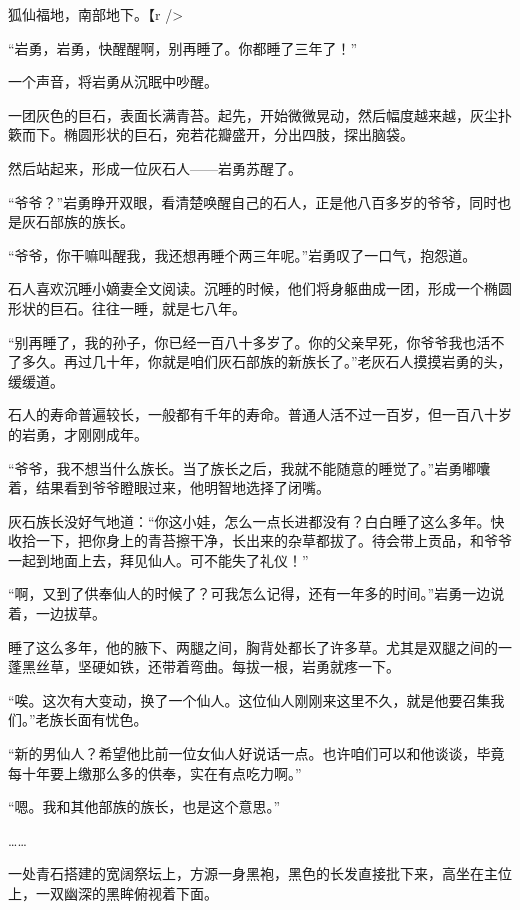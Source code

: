 
\begin{this_body}

狐仙福地，南部地下。【r />

“岩勇，岩勇，快醒醒啊，别再睡了。你都睡了三年了！”

一个声音，将岩勇从沉眠中吵醒。

一团灰色的巨石，表面长满青苔。起先，开始微微晃动，然后幅度越来越，灰尘扑簌而下。椭圆形状的巨石，宛若花瓣盛开，分出四肢，探出脑袋。

然后站起来，形成一位灰石人——岩勇苏醒了。

“爷爷？”岩勇睁开双眼，看清楚唤醒自己的石人，正是他八百多岁的爷爷，同时也是灰石部族的族长。

“爷爷，你干嘛叫醒我，我还想再睡个两三年呢。”岩勇叹了一口气，抱怨道。

石人喜欢沉睡小嫡妻全文阅读。沉睡的时候，他们将身躯曲成一团，形成一个椭圆形状的巨石。往往一睡，就是七八年。

“别再睡了，我的孙子，你已经一百八十多岁了。你的父亲早死，你爷爷我也活不了多久。再过几十年，你就是咱们灰石部族的新族长了。”老灰石人摸摸岩勇的头，缓缓道。

石人的寿命普遍较长，一般都有千年的寿命。普通人活不过一百岁，但一百八十岁的岩勇，才刚刚成年。

“爷爷，我不想当什么族长。当了族长之后，我就不能随意的睡觉了。”岩勇嘟囔着，结果看到爷爷瞪眼过来，他明智地选择了闭嘴。

灰石族长没好气地道：“你这小娃，怎么一点长进都没有？白白睡了这么多年。快收拾一下，把你身上的青苔擦干净，长出来的杂草都拔了。待会带上贡品，和爷爷一起到地面上去，拜见仙人。可不能失了礼仪！”

“啊，又到了供奉仙人的时候了？可我怎么记得，还有一年多的时间。”岩勇一边说着，一边拔草。

睡了这么多年，他的腋下、两腿之间，胸背处都长了许多草。尤其是双腿之间的一蓬黑丝草，坚硬如铁，还带着弯曲。每拔一根，岩勇就疼一下。

“唉。这次有大变动，换了一个仙人。这位仙人刚刚来这里不久，就是他要召集我们。”老族长面有忧色。

“新的男仙人？希望他比前一位女仙人好说话一点。也许咱们可以和他谈谈，毕竟每十年要上缴那么多的供奉，实在有点吃力啊。”

“嗯。我和其他部族的族长，也是这个意思。”

……

一处青石搭建的宽阔祭坛上，方源一身黑袍，黑色的长发直接批下来，高坐在主位上，一双幽深的黑眸俯视着下面。


\end{this_body}
